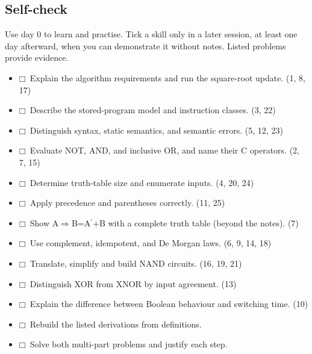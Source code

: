 \documentclass[11pt]{article}
\begin{document}
\begin{keepsection}
\section{Self-check}

Use day 0 to learn and practise. Tick a skill only in a later session, at least one day afterward, when you can demonstrate it without notes. Listed problems provide evidence.

\begin{itemize}
\item $\mdlgwhtsquare$\ Explain the algorithm requirements and run the square-root update. (1, 8, 17)
\item $\mdlgwhtsquare$\ Describe the stored-program model and instruction classes. (3, 22)
\item $\mdlgwhtsquare$\ Distinguish syntax, static semantics, and semantic errors. (5, 12, 23)
\item $\mdlgwhtsquare$\ Evaluate NOT, AND, and inclusive OR, and name their C operators. (2, 7, 15)
\item $\mdlgwhtsquare$\ Determine truth-table size and enumerate inputs. (4, 20, 24)
\item $\mdlgwhtsquare$\ Apply precedence and parentheses correctly. (11, 25)
\item $\mdlgwhtsquare$\ Show A\ensuremath{\Rightarrow}B=A\ensuremath{{}^{\prime}}+B with a complete truth table (beyond the notes). (7)
\item $\mdlgwhtsquare$\ Use complement, idempotent, and De Morgan laws. (6, 9, 14, 18)
\item $\mdlgwhtsquare$\ Translate, simplify and build NAND circuits. (16, 19, 21)
\item $\mdlgwhtsquare$\ Distinguish XOR from XNOR by input agreement. (13)
\item $\mdlgwhtsquare$\ Explain the difference between Boolean behaviour and switching time. (10)
\item $\mdlgwhtsquare$\ Rebuild the listed derivations from definitions.
\item $\mdlgwhtsquare$\ Solve both multi-part problems and justify each step.
\end{itemize}
\end{keepsection}


\clearpage
\end{document}
